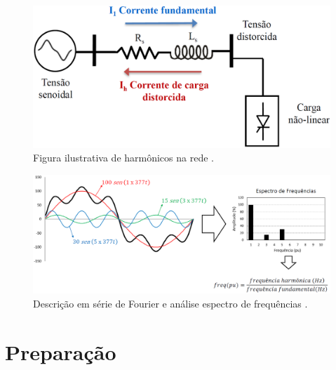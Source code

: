 \documentclass[a4paper,12pt,oneside,openany,table,xcdraw]{article}
\begin{document}
\vspace{1.1cm}
\begin{figure}[H]
\hspace{0.4cm}
\centering
\includegraphics[width=12.5cm]{harmonicos}
\caption{Figura ilustrativa de harmônicos na rede \cite{PH}.}
\label{intro:fig1}
\end{figure}

\begin{figure}[H]
\hspace{0.4cm}
\centering
\includegraphics[width=12.5cm]{espectro}
\caption{Descrição em série de Fourier  e análise espectro de frequências \cite{PH}.}
\label{intro:fig2}
\end{figure}
\vspace{0.3cm}

\section{Preparação}
\end{document}
